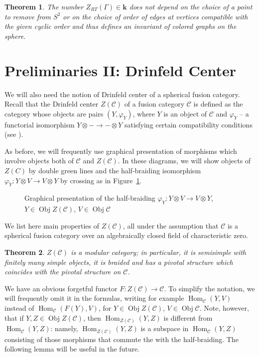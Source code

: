 \documentclass{amsart}
\newtheorem{theorem}{Theorem}[section]
\theoremstyle{definition}
\theoremstyle{remark}
\numberwithin{equation}{section}
\newcommand{\firef}[1]{Figure~{\rm\ref{#1}}}
\newcommand{\<}{\langle}
\renewcommand{\>}{\rangle}
\newcommand{\kk}{\mathbf{k}}       %
\newcommand{\C}{\mathcal{C}}      %
\newcommand{\Ga}{\Gamma}
\newcommand{\ph}{\varphi}
\DeclareMathOperator{\Hom}{Hom}
\DeclareMathOperator{\Obj}{Obj}
\begin{document}
 
\begin{theorem}\label{t:spherical1}
  The number $Z_{RT}(\Ga)\in \kk$ does not depend on the choice of a point 
  to remove from $S^2$ or on the choice of  order of edges at
  vertices compatible with the given cyclic order and thus defines an
  invariant of colored graphs on the sphere.
\end{theorem}


\section{Preliminaries II: Drinfeld Center}\label{s:center}


We will also need the notion of Drinfeld center of a spherical fusion
category. Recall that the Drinfeld center $Z(\C)$ of a fusion category $\C$
is defined as the category whose objects are pairs $(Y,\ph_Y)$, where $Y$
is an object of $\C$ and $\ph_Y$ -- a functorial isomorphism $Y\otimes -\to
-\otimes Y$ satisfying certain compatibility conditions (see
).

As before, we will frequently use graphical presentation of morphisms
which involve objects both of $\C$ and $Z(\C)$. In these diagrams, we
will show objects of $Z(C)$ by double green lines   and the
half-braiding isomorphism $\ph_Y\colon Y\otimes V\to V\otimes Y$  by
crossing as in \firef{f:crossing}.
\begin{figure}[ht]
\tzCrossing
\caption{Graphical presentation of the half-braiding $\ph_Y\colon Y\otimes
V\to V\otimes Y$, $Y\in \Obj Z(\C)$, $V\in \Obj \C$}\label{f:crossing}
\end{figure}


We list here main properties of $Z(\C)$, all under the assumption that $\C$
is a spherical fusion category over an algebraically closed field of
characteristic zero.

\begin{theorem}{}
 $Z(\C)$ is a modular category; in particular, it is
    semisimple with finitely many simple objects, it is braided and has
    a pivotal structure which coincides with the pivotal structure on
    $\C$. 
\end{theorem}


We have an obvious forgetful functor $F\colon Z(\C)\to \C$. To simplify
the notation, we will frequently omit it in the formulas, writing for
example $\Hom_\C(Y,V)$ instead of $\Hom_\C(F(Y),V)$, for $Y\in \Obj
Z(\C)$, $V\in \Obj \C$. Note, however, that if $Y,Z\in \Obj Z(\C)$, then
$\Hom_{Z(\C)}(Y,Z)$ is different from $\Hom_{\C}(Y,Z)$: namely,
$\Hom_{Z(\C)}(Y,Z)$ is a subspace in $\Hom_{\C}(Y,Z)$ consisting of those
morphisms that commute the with the half-braiding. The following lemma will
be useful in the future. 
\end{document}
